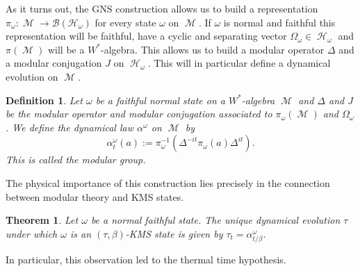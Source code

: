 \documentclass{article}
\DeclareMathOperator{\M}{\mathcal{M}}
\DeclareMathOperator{\h}{\mathcal{H}}
\newtheorem{definition}{Definition}[section]
\newtheorem{theorem}{Theorem}[section]
\begin{document}
As it turns out, the GNS construction allows us to build a representation $\pi_\omega:\M\rightarrow\mathcal{B}(\mathcal{H}_\omega)$ for every state $\omega$ on $\M$. If $\omega$ is normal and faithful this representation will be faithful, have a cyclic and separating vector $\Omega_\omega\in\h_\omega$ and $\pi(\M)$ will be a $W^*$-algebra. This allows us to build a modular operator $\Delta$ and a modular conjugation $J$ on $\h_\omega$. This will in particular define a dynamical evolution on $\M$.
\begin{definition}
Let $\omega$ be a faithful normal state on a $W^*$-algebra $\M$ and $\Delta$ and $J$ be the modular operator and modular conjugation associated to $\pi_\omega(\M)$ and $\Omega_\omega$. We define the dynamical law $\alpha^\omega$ on $\M$ by 
\begin{equation}
\alpha^\omega_t(a):=\pi_\omega^{-1}(\Delta^{-it}\pi_\omega(a)\Delta^{it}).
\end{equation}
This is called the modular group.
\end{definition}
The physical importance of this construction lies precisely in the connection between modular theory and KMS states.
\begin{theorem}
Let $\omega$ be a normal faithful state. The unique dynamical evolution $\tau$ under which $\omega$ is an $(\tau,\beta)$-KMS state is given by $\tau_t=\alpha^\omega_{t/\beta}$.
\end{theorem}
In particular, this observation led to the thermal time hypothesis.
\end{document}
